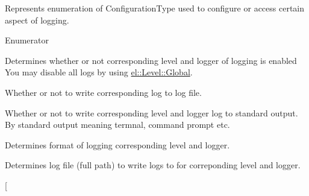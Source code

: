 Represents enumeration of Configuration\-Type used to configure or access certain aspect of logging. 

\begin{Desc}
\item[Enumerator]\par
\begin{description}
\item[{\em 
\hypertarget{namespaceel_a281f5db6d6163678bc68a8b23b59e124a00d23a76e43b46dae9ec7aa9dcbebb32}{Enabled}\label{namespaceel_a281f5db6d6163678bc68a8b23b59e124a00d23a76e43b46dae9ec7aa9dcbebb32}
}]Determines whether or not corresponding level and logger of logging is enabled You may disable all logs by using \hyperlink{namespaceel_ab0ac6091262344c52dd2d3ad099e8e36a4cc6684df7b4a92b1dec6fce3264fac8}{el\-::\-Level\-::\-Global}. \item[{\em 
\hypertarget{namespaceel_a281f5db6d6163678bc68a8b23b59e124acb76297988b895ca263f62728b32dbcc}{To\-File}\label{namespaceel_a281f5db6d6163678bc68a8b23b59e124acb76297988b895ca263f62728b32dbcc}
}]Whether or not to write corresponding log to log file. \item[{\em 
\hypertarget{namespaceel_a281f5db6d6163678bc68a8b23b59e124a9b9a9244b0b26da988f9af8310ab899d}{To\-Standard\-Output}\label{namespaceel_a281f5db6d6163678bc68a8b23b59e124a9b9a9244b0b26da988f9af8310ab899d}
}]Whether or not to write corresponding level and logger log to standard output. By standard output meaning termnal, command prompt etc. \item[{\em 
\hypertarget{namespaceel_a281f5db6d6163678bc68a8b23b59e124a520d0db389f362bf79ef56ca0af3dcab}{Format}\label{namespaceel_a281f5db6d6163678bc68a8b23b59e124a520d0db389f362bf79ef56ca0af3dcab}
}]Determines format of logging corresponding level and logger. \item[{\em 
\hypertarget{namespaceel_a281f5db6d6163678bc68a8b23b59e124a1351017ac6423911223bc19a8cb7c653}{Filename}\label{namespaceel_a281f5db6d6163678bc68a8b23b59e124a1351017ac6423911223bc19a8cb7c653}
}]Determines log file (full path) to write logs to for correponding level and logger. \item[{\em 
}
\end{description}
\end{Desc}
